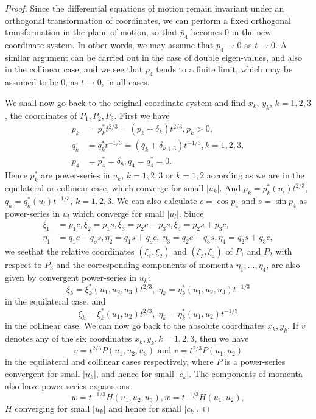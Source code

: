 \begin{proof}
Since the differential equations of motion remain invariant under an
orthogonal transformation of coordinates, we can perform a fixed
orthogonal transformation in the plane of motion, so that $\bar{p}_4$
becomes $0$  in the new coordinate system. In other words, we may
assume that $p_4 \to 0$ as $t \to 0$. A similar argument can be
carried out in the case of double eigen-values, and also in the
collinear case, and we see that $p_4$ tends to a finite limit, which
may be assumed to be 0, as $t \to 0$, in all cases. 

We shall now go back to the original coordinate system and find $x_k$,
$y_k$, $k =1,2,3$, the coordinates of $P_1, P_2, P_3$. First we have 
\begin{align*}
p_k & = p^*_k t^{2/3}  = (\bar{p}_k + \delta_k) t^{2/3}, \bar{p}_k > 0, \\
q_k & = q^*_k t^{-1/3} = (\bar{q}_k + \delta_{k+3}) t^{-1/3}, k =1,2,3,\\
p_4 & = p^*_4 = \delta_8, q_4 = q^*_4 = 0. 
\end{align*}
Hence $p^*_k$ are power-series in $u_k$, $k=1,2,3$ or $k=1,2$
according as we are in the equilateral or collinear case, which
converge for small $|u_k|$. And $p_k= p^*_k (u_l) t^{2/3}$, $q_k =
q^*_k (u_l) t^{-1/3}$, $k =1,2,3$. We can also calculate $c = \cos
p_4$ and $s = \sin p_4$ as power-series in $u_l$ which converge for
small $|u_l|$. Since 
\begin{align*}
\xi_1 & = p_1 c, \xi_2 = p_1 s, \xi_3 = p_2 c - p_3 s, \xi_4 = p_2 s +
p_3 c, \\ 
\eta_1 & = q_1 c - q_o s, \eta_2 = q_1 s  + q_o c, \; \eta_3 = q_2 c -
q_3 s , \eta_4 = q_2 s + q_3 c, 
\end{align*}
we see\pageoriginale that the relative coordinates $(\xi_1, \xi_2)$
and $(\xi_3, \xi_4)$ of $P_1$ and $P_2$ with respect to $P_3$ and the
corresponding components of momenta $\eta_1, \ldots, \eta_4$, are also
given by convergent power-series in $u_k$: 
$$
\xi_k = \xi^*_k (u_1, u_2, u_3) t^{2/3}, \; \eta_k = \eta^*_k (u_1,
u_2, u_3) t^{-1/3} 
$$
in the equilateral case, and 
$$
\xi_k = \xi^*_k (u_1, u_2) t^{2/3}, \; \eta_k = \eta^*_k (u_1, u_2) t^{-1/3}
$$ 
in the collinear case. We can now go back to the absolute coordinates 
$x_k, y_k$. If $v$ denotes any of the six coordinates $x_k, y_k, k
=1,2,3$, then we have 
$$
v= t^{2/3} P(u_1, u_2, u_3)\text{ and } v = t^{2/3} P(u_1, u_2)
$$
in the equilateral and collinear cases respectively, where $P$ is a
power-series convergent for small $|u_k|$, and hence for small
$|c_k|$. The components of momenta also have power-series expansions 
$$
w = t^{-1/3} H (u_1, u_2, u_3), w = t^{-1/3} H(u_1, u_2),
$$
$H$ converging for small $|u_k|$ and hence for small $|c_k|$. 


\end{proof}
